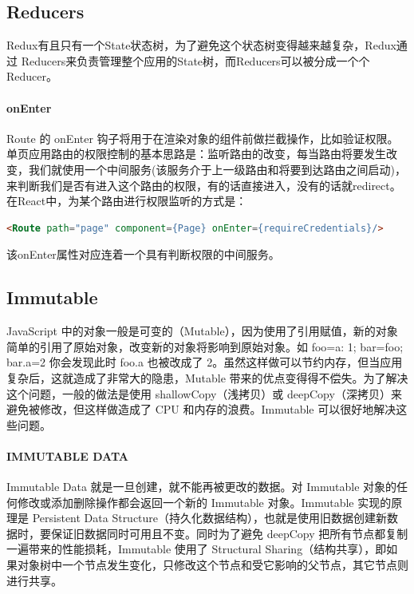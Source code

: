 \documentclass[letter]{book}
\begin{document}
\subsection{Reducers}

Redux有且只有一个State状态树，为了避免这个状态树变得越来越复杂，Redux通过 Reducers来负责管理整个应用的State树，而Reducers可以被分成一个个Reducer。


\paragraph{onEnter}

Route 的 onEnter 钩子将用于在渲染对象的组件前做拦截操作，比如验证权限。单页应用路由的权限控制的基本思路是：监听路由的改变，每当路由将要发生改变，我们就使用一个中间服务(该服务介于上一级路由和将要到达路由之间启动)，来判断我们是否有进入这个路由的权限，有的话直接进入，没有的话就redirect。在React中，为某个路由进行权限监听的方式是：

\begin{lstlisting}[language=HTML]
<Route path="page" component={Page} onEnter={requireCredentials}/>
\end{lstlisting}

该onEnter属性对应连着一个具有判断权限的中间服务。

\subsection{Immutable}

JavaScript 中的对象一般是可变的（Mutable），因为使用了引用赋值，新的对象简单的引用了原始对象，改变新的对象将影响到原始对象。如 foo={a: 1}; bar=foo; bar.a=2 你会发现此时 foo.a 也被改成了 2。虽然这样做可以节约内存，但当应用复杂后，这就造成了非常大的隐患，Mutable 带来的优点变得得不偿失。为了解决这个问题，一般的做法是使用 shallowCopy（浅拷贝）或 deepCopy（深拷贝）来避免被修改，但这样做造成了 CPU 和内存的浪费。Immutable 可以很好地解决这些问题。

\paragraph{IMMUTABLE DATA}

Immutable Data 就是一旦创建，就不能再被更改的数据。对 Immutable 对象的任何修改或添加删除操作都会返回一个新的 Immutable 对象。Immutable 实现的原理是 Persistent Data Structure（持久化数据结构），也就是使用旧数据创建新数据时，要保证旧数据同时可用且不变。同时为了避免 deepCopy 把所有节点都复制一遍带来的性能损耗，Immutable 使用了 Structural Sharing（结构共享），即如果对象树中一个节点发生变化，只修改这个节点和受它影响的父节点，其它节点则进行共享。
\end{document}
